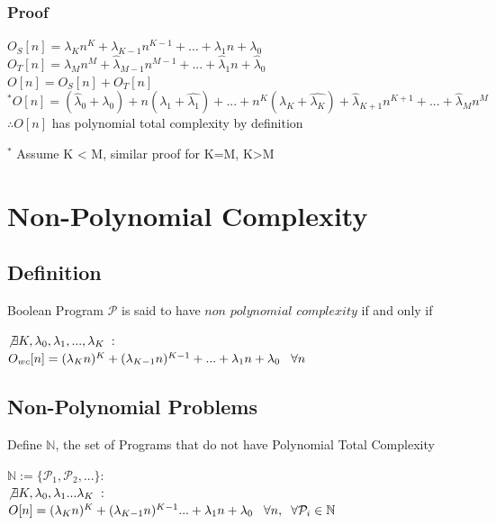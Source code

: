 \documentclass[11pt]{article}
\begin{document}
\subsubsection{Proof}
\begin{center}
\vspace{1mm}
$
O_S[n] = \lambda_K n^K + \lambda_{K-1} n^{K-1} + ... + \lambda_1 n + \lambda_0
$
\\ \vspace{3mm}
$
O_T[n] = \hat{\lambda}_M n^M + \hat{\lambda}_{M-1} n^{M-1} + ... + \hat{\lambda}_1 n + \hat{\lambda}_0
$
\\ \vspace{3mm}
$
O[n] = O_S[n] + O_T[n]
$
\\ \vspace{3mm}
$
^*O[n] = (\hat{\lambda}_0 + \lambda_0) + n(\lambda_1 + \hat{\lambda_1}) + ... + n^K(\lambda_K + \hat{\lambda_K}) + \hat{\lambda}_{K+1}n^{K+1} + ... +  \hat{\lambda}_M n^M
$
\\ \vspace{3mm}
$
\therefore O[n]$ has polynomial total complexity by definition
\end{center}
$^*$ Assume K < M, similar proof for K=M, K>M




\newpage
\section{Non-Polynomial Complexity}
\subsection{Definition}
Boolean Program $\mathcal{P}$ is said to have $non$ $polynomial$ $complexity$ if and only if
\begin{center}
$\not \exists K,\lambda_0,\lambda_1,...,\lambda_K \hspace{1mm} :$
\\ \vspace{2mm}
$O_{wc}[n] = (\lambda_K n)^K + (\lambda_{K-1} n)^{K-1} + ... + \lambda_1 n + \lambda_0 \hspace{3mm} \forall n$
\end{center}


\subsection{Non-Polynomial Problems}
Define $\mathbb{N}$, the set of Programs that do not have Polynomial Total Complexity
\begin{center}
$
\mathbb{N} := \{\mathcal{P}_1,\mathcal{P}_2,...\} :
$
\\ \vspace{2mm}
$\not \exists K,\lambda_0,\lambda_1...\lambda_K \hspace{1mm} :$
\\ \vspace{2mm}
$O[n] = (\lambda_K n)^K + (\lambda_{K-1} n)^{K-1}... + \lambda_1 n + \lambda_0 \hspace{3mm} \forall n, \hspace{2mm}  \forall \mathcal{P}_i \in \mathbb{N}$
\end{center}
\end{document}

